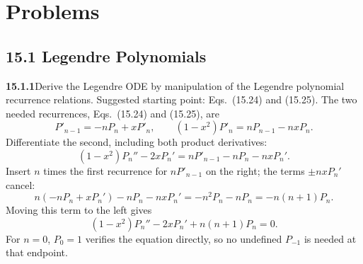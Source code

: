 
\section*{Problems}

\subsection*{15.1 Legendre Polynomials}

\par\bigskip
\noindent\textbf{15.1.1}\quad Derive the Legendre ODE by manipulation
of the Legendre polynomial recurrence relations. Suggested starting
point: Eqs.~(15.24) and (15.25).
\solution
The two needed recurrences, Eqs.~(15.24) and (15.25), are
\[
P'_{n-1}=-nP_n+xP'_n,\qquad
(1-x^2)P'_n=nP_{n-1}-nxP_n.
\]
Differentiate the second, including both product derivatives:
\[
(1-x^2)P_n''-2xP_n'
=nP'_{n-1}-nP_n-nxP_n'.
\]
Insert $n$ times the first recurrence for $nP'_{n-1}$ on the right; the
terms $\pm nxP_n'$ cancel:
\[
n(-nP_n+xP_n')-nP_n-nxP_n'=-n^2P_n-nP_n=-n(n+1)P_n.
\]
Moving this term to the left gives
\[
\boxed{(1-x^2)P_n''-2xP_n'+n(n+1)P_n=0}.
\]
For $n=0$, $P_0=1$ verifies the equation directly, so no undefined
$P_{-1}$ is needed at that endpoint.


